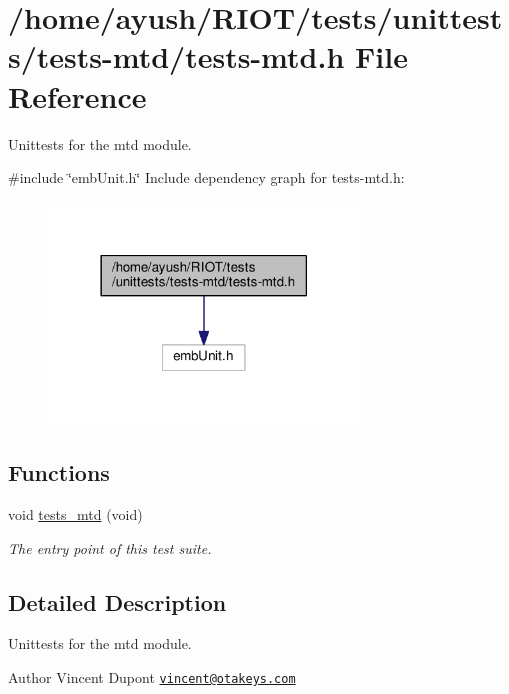 \hypertarget{tests-mtd_8h}{}\section{/home/ayush/\+R\+I\+O\+T/tests/unittests/tests-\/mtd/tests-\/mtd.h File Reference}
\label{tests-mtd_8h}


Unittests for the {\ttfamily mtd} module.  


{\ttfamily \#include \char`\"{}emb\+Unit.\+h\char`\"{}}\newline
Include dependency graph for tests-\/mtd.h\+:
\nopagebreak
\begin{figure}[H]
\begin{center}
\leavevmode
\includegraphics[width=234pt]{tests-mtd_8h__incl}
\end{center}
\end{figure}
\subsection*{Functions}
\begin{DoxyCompactItemize}
\item 
void \hyperlink{group__unittests_gad7854ffe9d06ab8bcefaf3b778460f2a}{tests\+\_\+mtd} (void)
\begin{DoxyCompactList}\small\item\em The entry point of this test suite. \end{DoxyCompactList}\end{DoxyCompactItemize}


\subsection{Detailed Description}
Unittests for the {\ttfamily mtd} module. 

\begin{DoxyAuthor}{Author}
Vincent Dupont \href{mailto:vincent@otakeys.com}{\tt vincent@otakeys.\+com} 
\end{DoxyAuthor}
